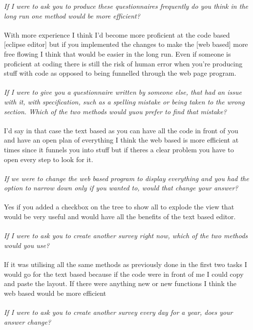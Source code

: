 \documentclass{report}
\begin{document}
\textit{If I were to ask you to produce these questionnaires frequently do you think in the long run one method would be more efficient?}
\\
\\
With more experience I think I'd become more proficient at the code based [eclipse editor] but if you implemented the changes to make the [web based] more free flowing I think that would be easier in the long run. Even if someone is proficient at coding there is still the risk of human error when you're producing stuff with code as opposed to being funnelled through the web page program.
\\
\\
\textit{If I were to give you a questionnaire written by someone else, that had an issue with it, with specification, such as a spelling mistake or being taken to the wrong section. Which of the two methods would yuou prefer to find that mistake?}
\\
\\
I'd say in that case the text based as you can have all the code in front of you and have an open plan of everything I think the web based is more efficient at times since it funnels you into stuff but if theres a clear problem you have to open every step to look for it.
\\
\\
\textit{If we were to change the web based program to display everything and you had the option to narrow down only if you wanted to, would that change your answer?}
\\
\\
Yes if you added a checkbox on the tree to show all to explode the view that would be very useful and would have all the benefits of the text based editor.
\\
\\
\textit{If I were to ask you to create another survey right now, which of the two methods would you use?}
\\
\\
If it was utilising all the same methods as previously done in the first two tasks I would go for the text based because if the code were in front of me I could copy and paste the layout. If there were anything new or new functions I think the web based would be more efficient
\\
\\
\textit{If I were to ask you to create another survey every day for a year, does your answer change?}
\\
\\
\end{document}
